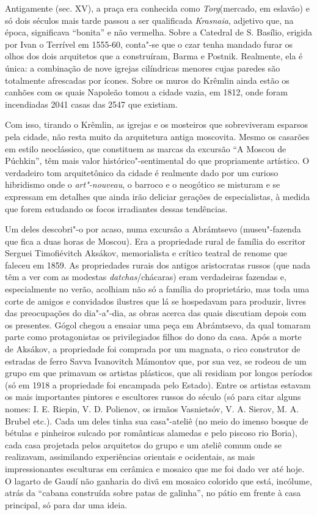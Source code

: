Antigamente (sec. XV), a praça era conhecida como \emph{Torg}(mercado,
em eslavão) e só dois séculos mais tarde passou a ser qualificada
\emph{Krasnaia}, adjetivo que, na época, significava ``bonita'' e não
vermelha. Sobre a Catedral de S. Basílio, erigida por Ivan o Terrível em
1555-60, conta"-se que o czar tenha mandado furar os olhos dos dois
arquitetos que a construíram, Barma e Postnik. Realmente, ela é única: a
combinação de nove igrejas cilíndricas menores cujas paredes são
totalmente afrescadas por ícones. Sobre os muros do Krêmlin ainda estão
os canhões com os quais Napoleão tomou a cidade vazia, em 1812, onde
foram incendiadas 2041 casas das 2547 que existiam.

Com isso, tirando o Krêmlin, as igrejas e os mosteiros que sobreviveram
esparsos pela cidade, não resta muito da arquitetura antiga moscovita.
Mesmo os casarões em estilo neoclássico, que constituem as marcas da
excursão ``A Moscou de Púchkin'', têm mais valor histórico"-sentimental
do que propriamente artístico. O verdadeiro tom arquitetônico da cidade
é realmente dado por um curioso hibridismo onde o \emph{art"-nouveau}, o
barroco e o neogótico se misturam e se expressam em detalhes que ainda
irão deliciar gerações de especialistas, à medida que forem estudando os
focos irradiantes dessas tendências.

Um deles descobri"-o por acaso, numa excursão a Abrámtsevo (museu"-fazenda
que fica a duas horas de Moscou). Era a propriedade rural de família do
escritor Serguei Timofiévitch Aksákov, memorialista e crítico teatral de
renome que faleceu em 1859. As propriedades rurais dos antigos
aristocratas russos (que nada têm a ver com as modestas
\emph{datchas}/chácaras) eram verdadeiras fazendas e, especialmente no
verão, acolhiam não só a família do proprietário, mas toda uma corte de
amigos e convidados ilustres que lá se hospedavam para produzir, livres
das preocupações do dia"-a"-dia, as obras acerca das quais discutiam
depois com os presentes. Gógol chegou a ensaiar uma peça em Abrámtsevo,
da qual tomaram parte como protagonistas os privilegiados filhos do dono
da casa. Após a morte de Aksákov, a propriedade foi comprada por um
magnata, o rico construtor de estradas de ferro Savva Ivanovitch
Mámontov que, por sua vez, se rodeou de um grupo em que primavam os
artistas plásticos, que ali residiam por longos períodos (só em 1918 a
propriedade foi encampada pelo Estado). Entre os artistas estavam os
mais importantes pintores e escultores russos do século (só para citar
alguns nomes: I. E. Riepin, V. D. Polienov, os irmãos Vasnietsóv, V. A.
Sierov, M. A. Brubel etc.). Cada um deles tinha sua casa"-ateliê (no meio
do imenso bosque de bétulas e pinheiros sulcado por românticas alamedas
e pelo piscoso rio Boria), cada casa projetada pelos arquitetos do grupo
e um ateliê comum onde se realizavam, assimilando experiências orientais
e ocidentais, as mais impressionantes esculturas em cerâmica e mosaico
que me foi dado ver até hoje. O lagarto de Gaudí não ganharia do divã em
mosaico colorido que está, incólume, atrás da ``cabana construída sobre
patas de galinha'', no pátio em frente à casa principal, só para dar uma
ideia.

